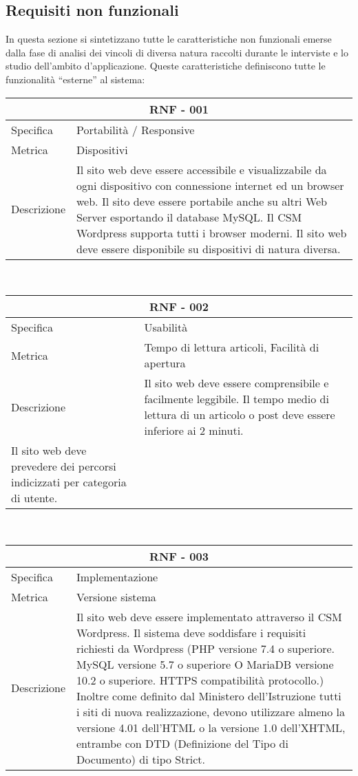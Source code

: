 \documentclass{article}
\begin{document}
\subsection{\textbf{Requisiti non funzionali}}
In questa sezione si sintetizzano tutte le caratteristiche non funzionali emerse dalla fase di  analisi dei vincoli di diversa natura raccolti durante le interviste e lo studio dell'ambito d'applicazione. Queste caratteristiche definiscono tutte le funzionalità “esterne” al sistema:
\vspace{4mm} \vspace{4mm} 
\begin{tabular}{ |p{3cm}|p{8cm}|  }
	\hline
	\multicolumn{2}{|c|}{\textbf{RNF - 001}} \\
	\hline
	Specifica&Portabilità / Responsive\\
	\hline
	Metrica & Dispositivi\\
	\hline
	Descrizione&Il sito web deve essere accessibile e visualizzabile da ogni dispositivo con connessione internet ed un browser web. Il sito deve essere portabile anche su altri Web Server esportando il database MySQL. Il CSM Wordpress supporta tutti i browser moderni. Il sito web deve essere disponibile su dispositivi di natura diversa.\\
	\hline
\end{tabular}\\
\vspace{4mm} 
\begin{tabular}{ |p{3cm}|p{8cm}|  }
	\hline
	\multicolumn{2}{|c|}{\textbf{RNF - 002}} \\
	\hline
	Specifica&Usabilità \\
	\hline
	Metrica & Tempo di lettura articoli, Facilità di apertura\\
	\hline
	Descrizione&Il sito web deve essere comprensibile e facilmente leggibile. Il tempo medio di lettura di un articolo o post deve essere inferiore ai 2 minuti.\\ Il sito web deve prevedere dei percorsi indicizzati per categoria di utente.\\
	\hline
\end{tabular}\\
\vspace{4mm} 
\begin{tabular}{ |p{3cm}|p{8cm}|  }
	\hline
	\multicolumn{2}{|c|}{\textbf{RNF - 003}} \\
	\hline
	Specifica &Implementazione\\
	\hline
	Metrica &  Versione sistema\\
	\hline
	Descrizione&Il sito web deve essere implementato attraverso il CSM Wordpress. Il sistema deve soddisfare i requisiti richiesti da Wordpress (PHP versione 7.4 o superiore.
	MySQL versione 5.7 o superiore O MariaDB versione 10.2 o superiore.
	HTTPS compatibilità protocollo.) Inoltre come definito dal Ministero dell'Istruzione tutti i siti di nuova realizzazione, devono utilizzare almeno la versione 4.01 dell'HTML o la versione 1.0 dell'XHTML, entrambe con DTD (Definizione del Tipo di Documento) di tipo Strict.\\
	\hline
\end{tabular}\\
\end{document}
